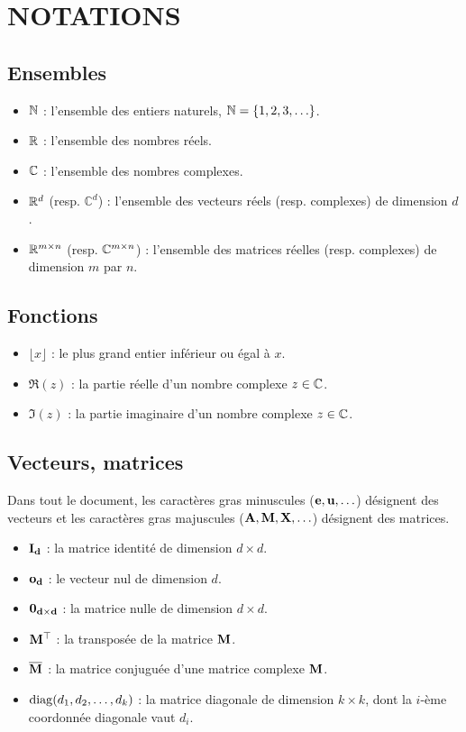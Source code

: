 \chapter*{NOTATIONS}
%
\label{chap:notations}


\section*{Ensembles}
\begin{itemize}
    \item $\bb{N}$ : l'ensemble des entiers naturels, $\bb{N} = \{1, 2, 3, \ldots \}$.
    \item $\R$ : l'ensemble des nombres réels.
    \item $\bb{C}$ : l'ensemble des nombres complexes.
    \item $\R^d$ (resp. $\mathbb{C}^d$) : l'ensemble des vecteurs réels (resp. complexes) de dimension $d$.
    \item $\R^{m \times n}$ (resp. $\bb{C}^{m \times n}$) : l'ensemble des matrices réelles (resp. complexes) de dimension $m$ par $n$.
 \end{itemize}
 
 \section*{Fonctions}
 \begin{itemize}
    \item $\lfloor x \rfloor$ : le plus grand entier inférieur ou égal à $x$.
     \item $\Re(z)$ : la partie réelle d'un nombre complexe $z \in \bb{C}$.
     \item $\Im(z)$ : la partie imaginaire d'un nombre complexe $z \in \bb{C}$.
 \end{itemize}
 
 \section*{Vecteurs, matrices}
 
 Dans tout le document, les caractères gras minuscules ($\bf{e, u, \ldots}$) désignent des vecteurs et les caractères gras majuscules ($\bf{A, M, X, \ldots}$) désignent des matrices.
 
 \begin{itemize}
    \item $\bf{I_d}$ : la matrice identité de dimension $d \times d$.
    \item $\bf{o_d}$ : le vecteur nul de dimension $d$.
    \item $\bf{0_{d \times d}}$ : la matrice nulle de dimension $d \times d$.
    \item $\bf{M}^\top$ : la transposée de la matrice $\bf{M}$.
    \item $\compconj{\bf{M}}$ : la matrice conjuguée d'une matrice complexe $\bf{M}$.
    \item $\diag(d_1, d_2, \ldots, d_k)$ : la matrice diagonale de dimension $k \times k$, dont la $i$-ème coordonnée diagonale vaut $d_i$.
\end{itemize}


